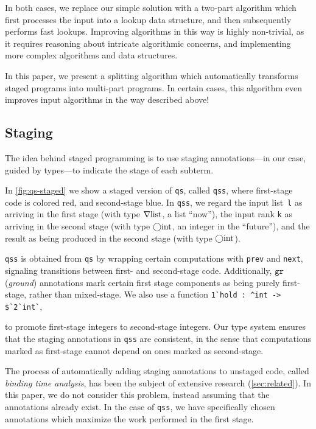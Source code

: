 \begin{abstrsyn}
In both cases, we replace our simple solution with a two-part algorithm which
first processes the input into a lookup data structure, and then subsequently
performs fast lookups. Improving algorithms in this way is highly non-trivial,
as it requires reasoning about intricate algorithmic concerns, and implementing
more complex algorithms and data structures.  

In this paper, we present a splitting algorithm which automatically transforms
staged programs into multi-part programs. In certain cases, this algorithm even
improves input algorithms in the way described above!

\subsection{Staging}


The idea behind staged programming is to use staging annotations---in our case,
guided by types---to indicate the stage of each subterm. 

In \ref{fig:qs-staged} we show a staged version of \texttt{qs}, called
\texttt{qss}, where first-stage code is colored red, and second-stage blue. In
\texttt{qss}, we regard the input list~\texttt{l} as arriving in the first stage
(with type $\nabla\mathrm{list}$, a list ``now''), the input rank \texttt{k} as
arriving in the second stage (with type $\bigcirc{\rm int}$, an integer in the
``future''), and the result as being produced in the second stage (with type
$\bigcirc{\rm int}$).

\texttt{qss} is obtained from \texttt{qs} by wrapping certain computations with
\texttt{prev} and \texttt{next}, signaling transitions between first- and
second-stage code. Additionally, $\texttt{gr}$ (\emph{ground}) annotations 
mark certain first stage components as being purely first-stage, rather than mixed-stage.
%
We also use a function 
\lstinline{1`hold : ^int -> $`2`int`}, 
\begin{comment}$ this comment block is here for syntax highlighting reasons\end{comment}
to promote first-stage integers to second-stage integers.
%
Our type system ensures that the staging annotations in \texttt{qss} are
consistent, in the sense that computations marked as first-stage cannot depend
on ones marked as second-stage.

The process of automatically adding staging annotations to unstaged code,
called \emph{binding time analysis}, has been
the subject of extensive research (\ref{sec:related}). In this paper, we do not
consider this problem, instead assuming that the annotations already exist.
In the case of \texttt{qss}, we have specifically chosen annotations which
maximize the work performed in the first stage.


\end{abstrsyn}
